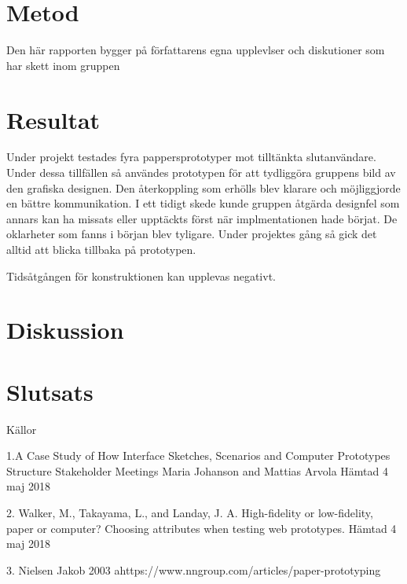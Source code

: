 \section{Metod}
Den här rapporten bygger på författarens egna upplevlser och diskutioner som har skett inom gruppen 

\section{Resultat}
Under projekt testades fyra pappersprototyper mot tilltänkta slutanvändare. Under dessa tillfällen så användes prototypen för att tydliggöra gruppens bild av den grafiska designen. Den återkoppling som erhölls blev klarare och möjliggjorde en bättre kommunikation. I ett tidigt skede kunde gruppen åtgärda designfel som annars kan ha missats eller upptäckts först när implmentationen hade börjat. De oklarheter som fanns i början blev tyligare. Under projektes gång så gick det alltid att blicka tillbaka på prototypen. 

Tidsåtgången för konstruktionen kan upplevas negativt.  

\section{Diskussion}


\section{Slutsats}



Källor

1.A Case Study of How Interface Sketches, Scenarios and Computer Prototypes Structure Stakeholder Meetings Maria Johanson and Mattias Arvola Hämtad 4 maj 2018  

2. Walker, M., Takayama, L., and Landay, J. A. High-fidelity or low-fidelity, paper or computer? Choosing attributes when testing web prototypes. Hämtad 4 maj 2018  

3. Nielsen Jakob 2003 
ahttps://www.nngroup.com/articles/paper-prototyping 